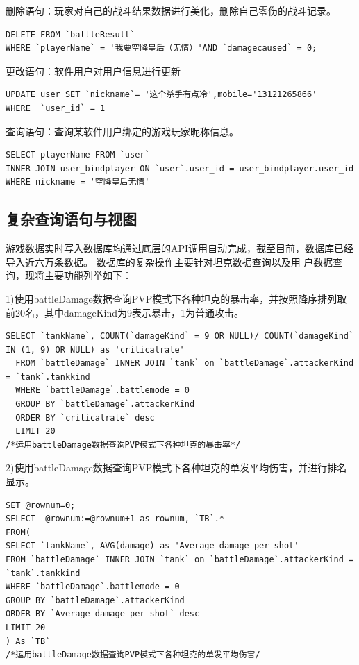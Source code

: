 \documentclass[UTF8, a4paper]{ctexart}
\begin{document}
删除语句：玩家对自己的战斗结果数据进行美化，删除自己零伤的战斗记录。
\begin{lstlisting}[style=A]
DELETE FROM `battleResult`
WHERE `playerName` = '我要空降皇后（无情）'AND `damagecaused` = 0;
\end{lstlisting}

更改语句：软件用户对用户信息进行更新
\begin{lstlisting}[style=A]
UPDATE user SET `nickname`= '这个杀手有点冷',mobile='13121265866' 
WHERE  `user_id` = 1
\end{lstlisting}

查询语句：查询某软件用户绑定的游戏玩家昵称信息。
\begin{lstlisting}[style=A]
SELECT playerName FROM `user` 
INNER JOIN user_bindplayer ON `user`.user_id = user_bindplayer.user_id
WHERE nickname = '空降皇后无情'
\end{lstlisting}

\subsection{复杂查询语句与视图}
游戏数据实时写入数据库均通过底层的API调用自动完成，截至目前，数据库已经导入近六万条数据。
数据库的复杂操作主要针对坦克数据查询以及用
户数据查询，现将主要功能列举如下：

1)使用battleDamage数据查询PVP模式下各种坦克的暴击率，并按照降序排列取前20名，其中damageKind为9表示暴击，1为普通攻击。

\begin{lstlisting}[style=A]
  SELECT `tankName`, COUNT(`damageKind` = 9 OR NULL)/ COUNT(`damageKind` IN (1, 9) OR NULL) as 'criticalrate'
  FROM `battleDamage` INNER JOIN `tank` on `battleDamage`.attackerKind = `tank`.tankkind
  WHERE `battleDamage`.battlemode = 0
  GROUP BY `battleDamage`.attackerKind
  ORDER BY `criticalrate` desc
  LIMIT 20
/*运用battleDamage数据查询PVP模式下各种坦克的暴击率*/
\end{lstlisting}

2)使用battleDamage数据查询PVP模式下各种坦克的单发平均伤害，并进行排名显示。
\begin{lstlisting}[style=A]
SET @rownum=0;						
SELECT  @rownum:=@rownum+1 as rownum, `TB`.*
FROM(
SELECT `tankName`, AVG(damage) as 'Average damage per shot'
FROM `battleDamage` INNER JOIN `tank` on `battleDamage`.attackerKind = `tank`.tankkind
WHERE `battleDamage`.battlemode = 0
GROUP BY `battleDamage`.attackerKind
ORDER BY `Average damage per shot` desc
LIMIT 20
) As `TB`
/*运用battleDamage数据查询PVP模式下各种坦克的单发平均伤害/
\end{lstlisting}
\end{document}
